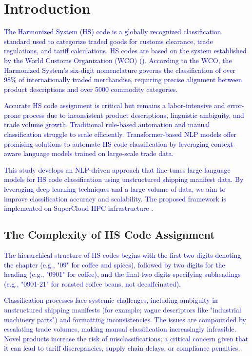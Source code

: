 \documentclass[mnsc,nonblindrev]{informs3} %
\begin{document}

\section{Introduction}

\textcolor{blue}{The Harmonized System (HS) code is a globally recognized classification standard used to categorize traded goods for customs clearance, trade regulations, and tariff calculations. HS codes are based on the system established by the World Customs Organization (WCO) (\cite{pierce2012concording}). According to the WCO, the Harmonized System's six-digit nomenclature governs the classification of over 98\% of internationally traded merchandise, requiring precise alignment between product descriptions and over 5000 commodity categories.}

\textcolor{blue}{Accurate HS code assignment is critical but remains a labor-intensive and error-prone process due to inconsistent product descriptions, linguistic ambiguity, and trade volume growth. Traditional rule-based automation and manual classification struggle to scale efficiently. Transformer-based NLP models offer promising solutions to automate HS code classification by leveraging context-aware language models trained on large-scale trade data.}

\textcolor{blue}{This study develops an NLP-driven approach that fine-tunes large language models for HS code classification using unstructured shipping manifest data. By leveraging deep learning techniques and a large volume of data, we aim to improve classification accuracy and scalability. The proposed framework is implemented on SuperCloud HPC infrastructure \cite{reuther2018interactive}.}

\subsection{The Complexity of HS Code Assignment} 
\textcolor{blue}{The hierarchical structure of HS codes begins with the first two digits denoting the chapter (e.g., "09" for coffee and spices), followed by two digits for the heading (e.g., "0901" for coffee), and the final two digits specifying subheadings (e.g., "0901-21" for roasted coffee beans, not decaffeinated).} 

\textcolor{blue}{Classification processes face systemic challenges, including ambiguity in unstructured shipping manifests (for example; vague descriptors like "industrial machinery parts") and formatting inconsistencies. The issues are compounded by escalating trade volumes, making manual classification increasingly infeasible. Novel products increase the risk of misclassifications; a critical concern given that it can lead to tariff discrepancies, supply chain delays, or compliance penalties.}
\end{document}
